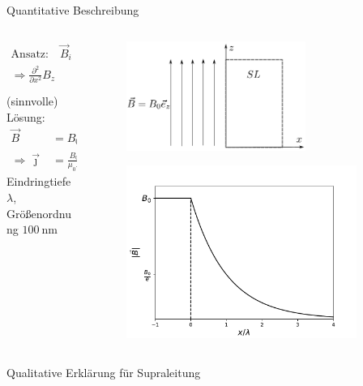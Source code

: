 \begin{frame}{Quantitative Beschreibung}

\begin{columns}
\begin{column}{0.49\textwidth}
\begin{align*}
    \text{Ansatz:} \quad \vec{B}_i &= (0, 0, B_z(x))^T \\
  \Rightarrow \frac{\partial ^2}{\partial x^2}B_z &= \frac{1}{\lambda ^2}B_z, \quad \lambda = \sqrt{\frac{m}{\mu_0 n q^2}}
\end{align*}
(sinnvolle) Lösung:
\begin{align*}
   \vec{B} &= B_0 \exp\left[-\frac{x}{\lambda}\right]\vec{e}_z \\
   \Rightarrow \vec{\jmath} &= \frac{B_0}{\mu_0 \lambda}\exp \left[-\frac{x}{\lambda} \right] \vec{e}_y
\end{align*}
Eindringtiefe $\lambda$, Größenordnung $\SI{100}{\nano\meter}$
\end{column}
\begin{column}{0.49\textwidth}
  \begin{figure}
    \centering
    \includegraphics[width = 0.7\textwidth]{bilder/supra_3.pdf}
    \label{fig: londongleichungen}
  \end{figure}
  \pause
  \begin{figure}
    \centering
    \includegraphics[width = 0.9\textwidth]{bilder/plot_london.pdf}
    \label{fig: plot_londongleichungen}
  \end{figure}
\end{column}
\end{columns}

\end{frame}


\begin{frame}{Qualitative Erklärung für Supraleitung}
  


\end{frame}
